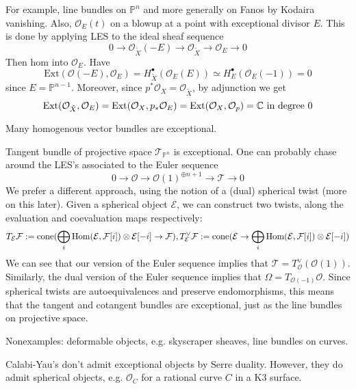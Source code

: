 For example, line bundles on $\mathbb{P}^n$ and more generally on Fanos by Kodaira vanishing. Also, $\mathcal{O}_{E}(t)$ on a blowup at a point with exceptional divisor $E$. This is done by applying LES to the ideal sheaf sequence $$0\xrightarrow{}\mathcal{O}_{\tilde{X}} (-E)\xrightarrow{}\mathcal{O}_{\tilde{X}}\xrightarrow{}\mathcal{O}_{E}\xrightarrow{}0$$Then hom into $\mathcal{O}_{E}$. Have $$\mathrm{Ext}(\mathcal{O}(-E), \mathcal{O}_{E})=H^\bullet_{\tilde{ X}} (\mathcal{O}_{E}(E))\simeq H^\bullet_{E} (\mathcal{O}_{E}(-1))=0$$since $E=\mathbb{P}^{n-1}$. Moreover, since $p^*\mathcal{O}_{X}=\mathcal{O}_{\tilde{X}}$, by adjunction we get $$\operatorname{Ext}(\mathcal{O}_{\tilde{X}}, \mathcal{O}_E)=\operatorname{Ext}(\mathcal{O}_X, p_*\mathcal{O}_E)=\operatorname{Ext}(\mathcal{O}_X, \mathcal{O}_p)=\mathbb{C} \text{ in degree }0$$

Many homogenous vector bundles are exceptional.

\begin{example}{Tangent bundle of projective space}{} 
    $\mathcal{T}_{\mathbb{P}^n}$ is exceptional. One can probably chase around the LES's associated to the Euler sequence $$0\rightarrow \mathcal{O}\rightarrow \mathcal{O}(1)^{\oplus n+1}\rightarrow \mathcal{T}\rightarrow 0$$
    We prefer a different approach, using the notion of a (dual) spherical twist (more on this later). Given a spherical object $\mathcal{E}$, we can construct two twists, along the evaluation and coevaluation maps respectively: $$T_\mathcal{E}\mathcal{F}:=\mathrm{cone}(\bigoplus_i \operatorname{Hom}(\mathcal{E},\mathcal{F}[i])\otimes \mathcal{E}[-i]\rightarrow \mathcal{F}), T^\lor_\mathcal{E}\mathcal{F}:=\mathrm{cone}(\mathcal{E}\rightarrow \bigoplus_i \operatorname{Hom}(\mathcal{E},\mathcal{F}[i])\otimes \mathcal{E}[-i] )$$
    We can see that our version of the Euler sequence implies that $\mathcal{T}=T^\lor_\mathcal{O}(\mathcal{O}(1))$. Similarly, the dual version of the Euler sequence implies that $\Omega=T_{\mathcal{O}(-1)}\mathcal{O}$. Since spherical twists are autoequivalences and preserve endomorphisms, this means that the tangent and cotangent bundles are exceptional, just as the line bundles on projective space.
\end{example}

Nonexamples: deformable objects, e.g. skyscraper sheaves, line bundles on curves.

\begin{remark}{}{}
    Calabi-Yau's don't admit exceptional objects by Serre duality. However, they do admit spherical objects, e.g. $\mathcal{O}_C$ for a rational curve $C$ in a K3 surface.
\end{remark}

